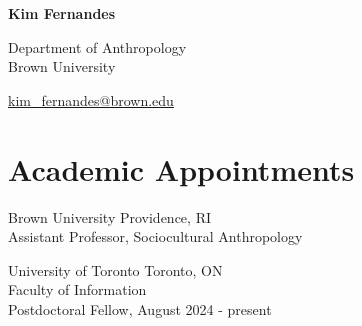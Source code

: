 \documentclass[11pt,letterpaper]{report}
\newcommand{\myname}{Kim Fernandes}
\newcommand{\namefont}[1]{{\normalfont\bfseries\Huge{#1}}}
\newcommand{\listitemspace}{0.25em}
\renewenvironment{itemize}{\begin{list}{}{\setlength{\leftmargin}{0em}\setlength{\parskip}{0em}\setlength{\itemsep}{\listitemspace}\setlength{\parsep}{\listitemspace}}}{\end{list}}
\begin{document}
    \raggedright{}
    \namefont{\myname}
    \vspace{1em}
    \begin{minipage}[t]{0.700\textwidth}
        Department of Anthropology \\
        Brown University
    \end{minipage}
    \begin{minipage}[t]{0.295\textwidth}
        \raggedleft{}
        \href{mailto:kim_fernandes@brown.edu}{kim\_fernandes@brown.edu}
    \end{minipage}

    \section*{Academic Appointments}
    \begin{itemize}
        \item Brown University Providence, RI\\
        Assistant Professor, Sociocultural Anthropology
        \item University of Toronto Toronto, ON\\
        Faculty of Information\\
        Postdoctoral Fellow, August 2024 - present
    \end{itemize}
\end{document}

